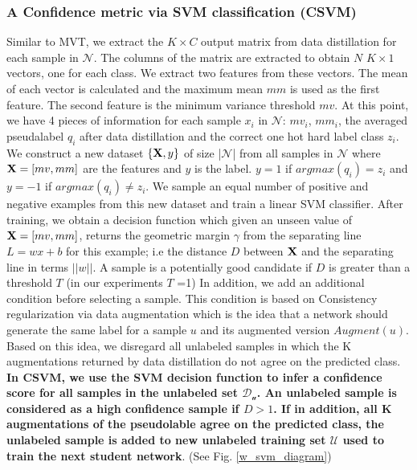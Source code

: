 \documentclass{article}
\begin{document}
\subsubsection{A Confidence metric via SVM classification (CSVM)}
Similar to MVT, we extract the $K\times C$ output matrix from data distillation for each sample in $\mathcal{N}$. The columns of the matrix are extracted to obtain $N$ $K\times 1$ vectors, one for each class. We extract two features from these vectors. The mean of each vector is calculated and the maximum mean $mm$ is used as the first feature. The second feature is the minimum variance threshold $mv$. At this point, we have 4 pieces of information for each sample $x_{i}$ in $\mathcal{N}$: $mv_{i}$, $mm_{i}$, the averaged pseudalabel $q_{i}$  after data distillation and the correct one hot hard label class $z_{i}$. We construct a new dataset $\{\bold{X}, y \}$ of size |$\mathcal{N}$| from all samples in $\mathcal{N}$  where $\bold{X} = [mv, mm]$ are the features and $y$ is the label. $y=1$ if $argmax(q_{i}) = z_{i}$ and $y=-1$ if $argmax(q_{i}) \neq z_{i}$.
\newline 
We sample an equal number of positive and negative examples from this new dataset and train a linear SVM classifier. After training, we obtain a decision function which given an unseen value of $\bold{X} = [mv, mm]$, returns the geometric margin $\gamma$ from the separating line $L = wx+b$ for this example; i.e the distance $D$ between $\bold{X}$ and the separating line in terms $||w||$. A sample is a potentially good candidate if $D$ is greater than a threshold $T$ (in our experiments $T$ =1)
\newline
In addition, we add an additional condition before selecting a sample. This condition is based on Consistency regularization via data augmentation which is the idea that a network should generate the same label for a sample $u$ and its augmented version $Augment(u)$. Based on this idea, we disregard all unlabeled samples in which the K augmentations returned by data distillation do not agree on the predicted class.
\textbf{In CSVM, we use the SVM decision function to infer a confidence score for all samples in the unlabeled set $\mathcal{D_{u}}$. An unlabeled sample is considered as a high confidence sample if $D>1$. If in addition, all K augmentations of the pseudolable agree on the predicted class, the unlabeled sample is added to new unlabeled training set $\mathcal{U}$ used to train the next student network}. (See Fig. \ref{w_svm_diagram})
\end{document}
